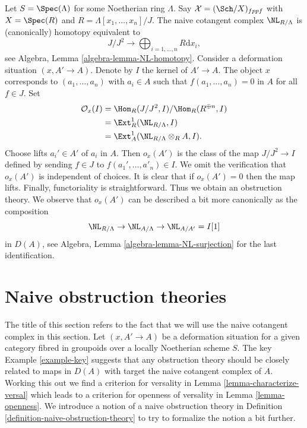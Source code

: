 \begin{example}
\label{example-key}
Let $S = \Spec(\Lambda)$ for some Noetherian ring $\Lambda$.
Say $\mathcal{X} = (\Sch/X)_{fppf}$ with $X = \Spec(R)$ and
$R = \Lambda[x_1, \ldots, x_n]/J$. The naive cotangent
complex $\NL_{R/\Lambda}$ is (canonically) homotopy equivalent to
$$
J/J^2
\longrightarrow
\bigoplus\nolimits_{i = 1, \ldots, n} R\text{d}x_i,
$$
see Algebra, Lemma \ref{algebra-lemma-NL-homotopy}.
Consider a deformation situation $(x, A' \to A)$. Denote by $I$ the kernel of
$A' \to A$. The object $x$ corresponds to $(a_1, \ldots, a_n)$
with $a_i \in A$ such that $f(a_1, \ldots, a_n) = 0$ in $A$ for all $f \in J$.
Set
\begin{align*}
\mathcal{O}_x(I)
& =
\Hom_R(J/J^2, I)/\Hom_R(R^{\oplus n}, I) \\
& =
\Ext^1_R(\NL_{R/\Lambda}, I) \\
& =
\Ext^1_A(\NL_{R/\Lambda} \otimes_R A, I).
\end{align*}
Choose lifts $a_i' \in A'$ of $a_i$ in $A$. Then $o_x(A')$
is the class of the map $J/J^2 \to I$ defined by sending $f \in J$ to
$f(a_1', \ldots, a'_n) \in I$. We omit the verification that
$o_x(A')$ is independent of choices. It is clear that if $o_x(A') = 0$
then the map lifts. Finally, functoriality is straightforward.
Thus we obtain an obstruction theory. We observe that $o_x(A')$
can be described a bit more canonically as the composition
$$
\NL_{R/\Lambda} \to \NL_{A/\Lambda} \to \NL_{A/A'} = I[1]
$$
in $D(A)$, see Algebra, Lemma \ref{algebra-lemma-NL-surjection}
for the last identification.
\end{example}









\section{Naive obstruction theories}
\label{section-naive-obstruction-theory}

\noindent
The title of this section refers to the fact that we will use the
naive cotangent complex in this section. Let $(x, A' \to A)$
be a deformation situation for a given category fibred in groupoids over a
locally Noetherian scheme $S$. The key Example \ref{example-key}
suggests that any obstruction theory should be closely related to
maps in $D(A)$ with target the naive cotangent complex of $A$.
Working this out we find a criterion for versality in
Lemma \ref{lemma-characterize-versal} which leads to a criterion for
openness of versality in Lemma \ref{lemma-openness}. We introduce a notion of
a naive obstruction theory in
Definition \ref{definition-naive-obstruction-theory} to try to formalize
the notion a bit further.

